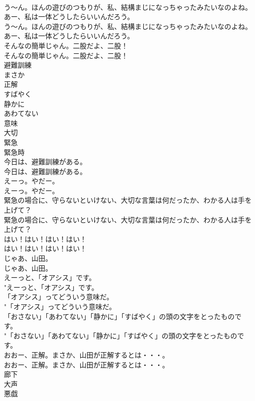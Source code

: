 \documentclass[8pt]{extreport}
\begin{document}
\begin{CJK}{UTF8}{min}
\\	う〜ん。ほんの遊びのつもりが、私、結構まじになっちゃったみたいなのよね。あー、私は一体どうしたらいいんだろう。	
\\	う〜ん。ほんの遊びのつもりが、私、結構まじになっちゃったみたいなのよね。あー、私は一体どうしたらいいんだろう。 
\\	そんなの簡単じゃん。二股だよ、二股！	
\\	そんなの簡単じゃん。二股だよ、二股！ 
\\	避難訓練
\\	まさか
\\	正解
\\	すばやく
\\	静かに
\\	あわてない
\\	意味
\\	大切
\\	緊急
\\	緊急時
\\	今日は、避難訓練がある。	
\\	今日は、避難訓練がある。 
\\	えーっ。やだー。	
\\	えーっ。やだー。 
\\	緊急の場合に、守らないといけない、大切な言葉は何だったか、わかる人は手を上げて？	
\\	緊急の場合に、守らないといけない、大切な言葉は何だったか、わかる人は手を上げて？ 
\\	はい！はい！はい！はい！	
\\	はい！はい！はい！はい！ 
\\	じゃあ、山田。	
\\	じゃあ、山田。 
\\	えーっと、「オアシス」です。	
\\	"えーっと、「オアシス」です。 
\\	「オアシス」ってどういう意味だ。	
\\	"「オアシス」ってどういう意味だ。 
\\	「おさない」「あわてない」「静かに」「すばやく」の頭の文字をとったものです。	
\\	"「おさない」「あわてない」「静かに」「すばやく」の頭の文字をとったものです。 
\\	おおー、正解。まさか、山田が正解するとは・・・。	
\\	おおー、正解。まさか、山田が正解するとは・・・。 
\\	廊下
\\	大声
\\	悪戯

\end{CJK}
\end{document}
